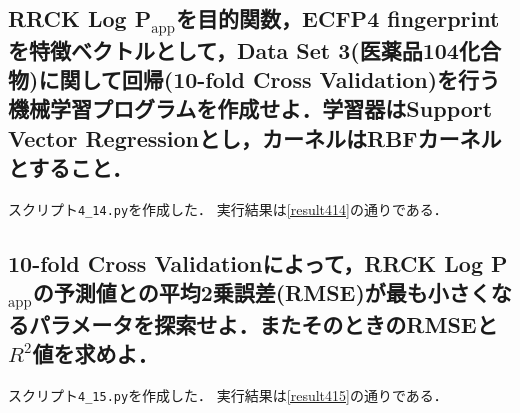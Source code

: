 \documentclass[uplatex,a4j]{jsarticle}
\begin{document}
  \subsection{RRCK Log P$_\text{app}$を目的関数，ECFP4 fingerprintを特徴ベクトルとして，Data Set 3(医薬品104化合物)に関して回帰(10-fold Cross Validation)を行う機械学習プログラムを作成せよ．学習器はSupport Vector Regressionとし，カーネルはRBFカーネルとすること．}
  スクリプト{\tt 4\_14.py}を作成した．
  実行結果は\ref{result414}の通りである．
  
  
  \subsection{10-fold Cross Validationによって，RRCK Log P$_\text{app}$の予測値との平均2乗誤差(RMSE)が最も小さくなるパラメータを探索せよ．またそのときのRMSEと$R^2$値を求めよ．}
  スクリプト{\tt 4\_15.py}を作成した．
  実行結果は\ref{result415}の通りである．
  
  
\end{document}
